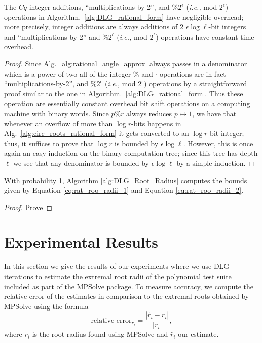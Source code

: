 \documentclass[sigconf]{acmart}
\begin{document}
\begin{theorem}\label{thm:ints}
The $Cq $  integer additions, ``multiplications-by-2'', and $ \%2^\epsilon $ (\emph{i.e.,} mod $ 2^\epsilon $) operations in Algorithm.~\ref{alg:DLG_rational_form} have negligible overhead; more precisely, integer additions are always additions of 2 $\epsilon \log \ell $-bit integers and ``multiplications-by-2'' and $ \%2^\epsilon $ (\emph{i.e.,} mod $ 2^\epsilon $) operations have constant time overhead.
\end{theorem}
\begin{proof}
  Since Alg.~\ref{alg:rational_angle_approx} always passes in a denominator which is a power of two all of the integer $\%$ and $\cdot$ operations are in fact ``multiplications-by-2'', and $ \%2^\epsilon $ (\emph{i.e.,} mod $ 2^\epsilon $) operations by a straightforward proof similar to the one in Algorithm.~\ref{alg:DLG_rational_form}. Thus these operation are essentially constant overhead bit shift operations on a computing machine with binary words. Since $p\% r$ always reduces $p \mapsto 1$, we have that whenever an overflow of more than $\log r$-bits happens in Alg.~\ref{alg:circ_roots_rational_form} it gets converted to an $\log r$-bit integer; thus, it suffices to prove that $\log r$ is bounded by  $\epsilon \log \ell $. However, this is once again an easy induction on the binary computation tree; since this tree has depth $\ell$ we see that any denominator is bounded by $\epsilon \log \ell $ by a simple induction. 
\end{proof}


\begin{theorem}\label{thm:lim_correctness}
With probability 1, Algorithm \ref{alg:DLG_Root_Radius} computes the bounds given by Equation \ref{eq:rat_roo_radii_1} and Equation \ref{eq:rat_roo_radii_2}.
\end{theorem}
\begin{proof}
Prove
\end{proof}
\section{Experimental Results}\label{sec:exp}

In this section we give the results of our experiments where we use DLG iterations to estimate the extremal root radii of the polynomial test suite included as part of the MPSolve package. To measure accuracy, we compute the relative error of the estimates in comparison to the extremal roots obtained by MPSolve using the formula
$$
\text{relative error}_{r_i} = \frac{|\tilde{r_i} - r_i|}{|r_i|},
$$
where $r_i$ is the root radius found using MPSolve and $\tilde{r_i}$ our estimate.
\end{document}
